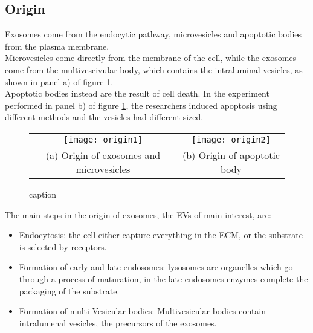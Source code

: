 \subsection{Origin}
Exosomes come from the endocytic pathway, microvesicles and apoptotic bodies from the plasma membrane.
\\
Microvesicles come directly from the membrane of the cell, while the exosomes come from the multivescivular body, which contains the intraluminal vesicles, as shown in panel a) of figure \ref{fig:origin}.
\\
Apoptotic bodies instead are the result of cell death. In the experiment performed in panel b) of figure \ref{fig:origin}, the researchers induced apoptosis using different methods and the vesicles had different sized.

\begin{figure}
\begin{tabular}{cc}
  \texttt{[image: origin1]} &   \texttt{[image: origin2]} \\
(a) Origin of exosomes and microvesicles & (b) Origin of apoptotic body \\[6pt]

\end{tabular}
\caption{caption}
\label{fig:origin}
\end{figure}

The main steps in the origin of exosomes, the EVs of main interest, are:
\begin{itemize}
\item Endocytosis: the cell either capture everything in the ECM, or the substrate is selected by receptors.
\item Formation of early and late endosomes: lysosomes are organelles which go through a process of maturation, in the late endosomes enzymes complete the packaging of the substrate.
\item Formation of multi Vesicular bodies: Multivesicular bodies contain intralumenal vesicles, the precursors of the exosomes.
\end{itemize}

